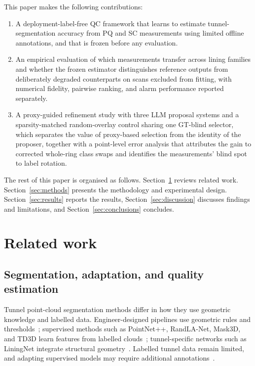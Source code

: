 \documentclass[a4paper,fleqn]{cas-dc}
\begin{document}
This paper makes the following contributions:
\begin{enumerate}
\item A deployment-label-free QC framework that learns to estimate tunnel-segmentation accuracy from PQ and SC measurements using limited offline annotations, and that is frozen before any evaluation.
\item An empirical evaluation of which measurements transfer across lining families and whether the frozen estimator distinguishes reference outputs from deliberately degraded counterparts on scans excluded from fitting, with numerical fidelity, pairwise ranking, and alarm performance reported separately.
\item A proxy-guided refinement study with three LLM proposal systems and a sparsity-matched random-overlay control sharing one GT-blind selector, which separates the value of proxy-based selection from the identity of the proposer, together with a point-level error analysis that attributes the gain to corrected whole-ring class swaps and identifies the measurements' blind spot to label rotation.
\end{enumerate}

The rest of this paper is organised as follows. Section~\ref{sec:related} reviews related work. Section~\ref{sec:methods} presents the methodology and experimental design. Section~\ref{sec:results} reports the results, Section~\ref{sec:discussion} discusses findings and limitations, and Section~\ref{sec:conclusions} concludes.

\section{Related work}
\label{sec:related}

\subsection{Segmentation, adaptation, and quality estimation}

Tunnel point-cloud segmentation methods differ in how they use geometric knowledge and labelled data. Engineer-designed pipelines use geometric rules and thresholds~\cite{huang2021bim,weidner2024generalized,wang2025automated}; supervised methods such as PointNet++, RandLA-Net, Mask3D, and TD3D learn features from labelled clouds~\cite{qi2017pointnet,hu2020randla,schult2023mask3d,kolodiazhnyi2024td3d}; tunnel-specific networks such as LiningNet integrate structural geometry~\cite{lin2025liningnet}. Labelled tunnel data remain limited, and adapting supervised models may require additional annotations~\cite{su2024review,cha2024deep}.
\end{document}
